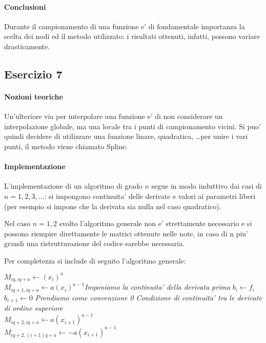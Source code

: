 \paragraph{Conclusioni}

Durante il campionamento di una funzione e' di fondamentale importanza la scelta
dei nodi ed il metodo utilizzato: i risultati ottenuti, infatti, possono variare
drasticamente.


\subsection{Esercizio 7}

\paragraph{Nozioni teoriche}

Un'ulteriore via per interpolare una funzione e' di non considerare un interpolazione globale, ma una locale tra i punti di campionamento vicini. Si puo' quindi
decidere di utilizzare una funzione linare, quadratica, \dots per unire i vari
punti, il metodo viene chiamato Spline.


\paragraph{Implementazione}

L'implementazione di un algoritmo di grado $n$ segue in modo induttivo dai casi
di $n=1,2,3, \dots$: si impongono continuita' delle derivate e valori ai parametri liberi (per esempio si impone che la derivata sia nulla nel caso quadratico).

Nel caso $n=1,2$ svolto l'algoritmo generale non e' strettamente necessario e si
possono riempire direttamente le matrici ottenute nelle note, in caso di n piu'
grandi una ristrutturazione del codice sarebbe necessaria.

Per completezza si include di seguito l'algoritmo generale:

\begin{algorithm}
	{
		{
			$M_{iq, iq+a} \leftarrow (x_i)^a$ \\
			$M_{iq+1, iq+a} \leftarrow a(x_i)^{a-1}$\quad \textit{Imponiamo la continuita' della derivata prima}
		}
		$b_i \leftarrow f_i$ \\
		$b_{i+1} \leftarrow 0$ \quad \textit{Prendiamo come convenzione 0}
	}
	 {
		{
			{
				\textit{Condizione di continuita' tra le derivate di ordine superiore} \\
				$M_{iq+2, iq+a} \leftarrow a(x_{i+1})^{a-1}$ \\
				$M_{iq+2,(i+1)q+a} \leftarrow -a(x_{i+1})^{a-1}$
			}
		}
	}
\end{algorithm}

